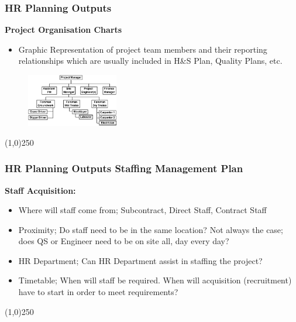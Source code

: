  
\begin{frame}
\frametitle{HR Planning Outputs}
\textbf{Project Organisation Charts}
\begin{itemize}
	\item Graphic Representation of project team members and their reporting relationships which are usually included in H\&S Plan, Quality Plans, etc.
\end{itemize}
\begin{figure}
	\centering
		\includegraphics[width = 4cm]{images/obs.jpg}
	\label{fig:obs2}
\end{figure}
\end{frame}\begin{center}\line(1,0){250}\end{center}




\begin{frame}
\frametitle{HR Planning Outputs \hfill Staffing Management Plan}
\textbf{Staff Acquisition:}
\begin{itemize}
	\item Where will staff come from; Subcontract, Direct Staff, Contract Staff
	\item Proximity; Do staff need to be in the same location? Not always the case; does QS or Engineer need to be on site all, day every day?
	\item HR Department; Can HR Department assist in staffing the project?
	\item Timetable;	When will staff be required. When will acquisition (recruitment) have to start in order to meet requirements?
\end{itemize}
\end{frame}\begin{center}\line(1,0){250}\end{center}
 
